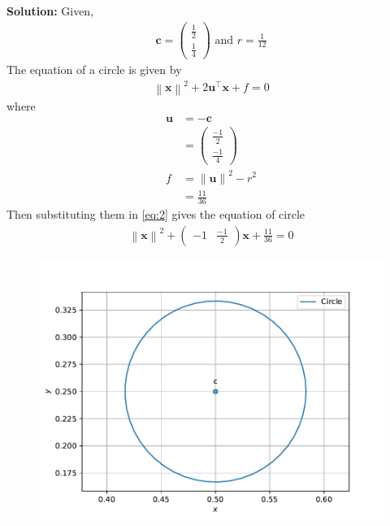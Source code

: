 \documentclass[12pt]{article}
\providecommand{\norm}[1]{\left\lVert#1\right\rVert}
\newcommand{\solution}{\noindent \textbf{Solution: }}
\newcommand{\myvec}[1]{\ensuremath{\begin{pmatrix}#1\end{pmatrix}}}
\let\vec\mathbf
\begin{document}
\begin{enumerate}
\solution Given,
		\begin{align}
			\vec{c}=\myvec{\frac{1}{2}\\[2pt] \frac{1}{4}}\text{ and }r=\frac{1}{12}
		\end{align}
		The equation of a circle is given by
		\begin{align}                                                                                          \norm{\vec{x}}^2 +2\vec{u}^\top\vec{x}+f=0 \label{eq:2}                                                                                  \end{align}
where
\begin{align}
	\vec{u}&=\vec{-c}\\
	&=\myvec{\frac{-1}{2}\\[2pt] \frac{-1}{4}}\\
	f&=\norm{\vec{u}}^2 -r^2\\
	&=\frac{11}{36}
\end{align}
		Then substituting them in \eqref{eq:2} gives the equation of circle
\begin{align}
	\norm{\vec{x}}^2 + \myvec{-1 & \frac{-1}{2}}\vec{x}+\frac{11}{36}=0
\end{align}
\begin{figure}[!h]
\begin{center}
\includegraphics[width=\columnwidth]{figs/fig.pdf}
\end{center}
\label{fig:Fig1}
\end{figure}
\end{enumerate}
\end{document}
